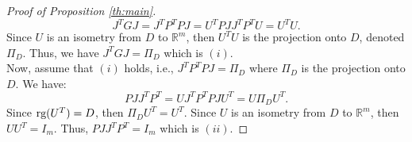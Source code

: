 \documentclass[entropy,article,submit,pdftex,moreauthors]{Definitions/mdpi}
\newcommand{\R}{\ensuremath{\mathbb{R}}}
\theoremstyle{plain}
\theoremstyle{definition}
\newcommand{\rg}{\textnormal{rg}}
\begin{document}
\begin{proof}[Proof of Proposition \ref{th:main}]
    \begin{equation*}
        J^T G J = J^TP^TPJ = U^T PJJ^TP^T U = U^T U.
    \end{equation*}
    Since $U$ is an isometry from $D$ to $\R^m$, then $U^TU$ is the projection onto $D$, denoted $\Pi_D$. Thus, we have $J^TGJ = \Pi_D$ which is $(i)$. \\
    Now, assume that $(i)$ holds, i.e., $J^TP^TPJ = \Pi_D$ where $\Pi_D$ is the projection onto $D$. We have:
    \begin{equation*}
        PJJ^TP^T = UJ^TP^TPJU^T =U\Pi_DU^T. 
    \end{equation*}
    Since $\rg(U^T) = D$, then $\Pi_D U^T = U^T$. Since $U$ is an isometry from $D$ to $\R^m$, then $UU^T=I_m$. Thus, $PJJ^TP^T = I_m$ which is $(ii)$.
\end{proof}






\end{document}
